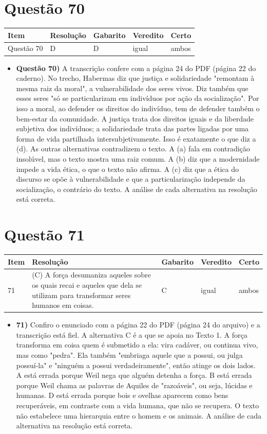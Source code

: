 \documentclass{article}%
\begin{document}
\section*{Questão 70}%
\begin{longtable}{@{}p{} p{} p{} p{} p{}@{}}\toprule Item & Resolução & Gabarito & Veredito & Certo \\ \midrule
Questão 70 & D & D & igual & ambos \\
\bottomrule\end{longtable}%
\begin{itemize}%
\item%
\textbf{Questão 70)} A transcrição confere com a página 24 do PDF (página 22 do caderno). No trecho, Habermas diz que justiça e solidariedade "remontam à mesma raiz da moral", a vulnerabilidade dos seres vivos. Diz também que esses seres "só se particularizam em indivíduos por ação da socialização". Por isso a moral, ao defender os direitos do indivíduo, tem de defender também o bem{-}estar da comunidade. A justiça trata dos direitos iguais e da liberdade subjetiva dos indivíduos; a solidariedade trata das partes ligadas por uma forma de vida partilhada intersubjetivamente. Isso é exatamente o que diz a (d). As outras alternativas contradizem o texto. A (a) fala em contradição insolúvel, mas o texto mostra uma raiz comum. A (b) diz que a modernidade impede a vida ética, o que o texto não afirma. A (c) diz que a ética do discurso se opõe à vulnerabilidade e que a particularização independe da socialização, o contrário do texto. A análise de cada alternativa na resolução está correta.%
\end{itemize}%
\section*{Questão 71}%
\begin{longtable}{@{}p{} p{} p{} p{} p{}@{}}\toprule Item & Resolução & Gabarito & Veredito & Certo \\ \midrule
71 & (C) A força desumaniza aqueles sobre os quais recai e aqueles que dela se utilizam para transformar seres humanos em coisas. & C & igual & ambos \\
\bottomrule\end{longtable}%
\begin{itemize}%
\item%
\textbf{71)} Confiro o enunciado com a página 22 do PDF (página 24 do arquivo) e a transcrição está fiel. A alternativa C é a que se apoia no Texto 1. A força transforma em coisa quem é submetido a ela: vira cadáver, ou continua vivo, mas como "pedra". Ela também "embriaga aquele que a possui, ou julga possuí{-}la" e "ninguém a possui verdadeiramente", então atinge os dois lados. A está errada porque Weil nega que alguém detenha a força. B está errada porque Weil chama as palavras de Aquiles de "razoáveis", ou seja, lúcidas e humanas. D está errada porque bois e ovelhas aparecem como bens recuperáveis, em contraste com a vida humana, que não se recupera. O texto não estabelece uma hierarquia entre o homem e os animais. A análise de cada alternativa na resolução está correta.%
\end{itemize}%
\end{document}
